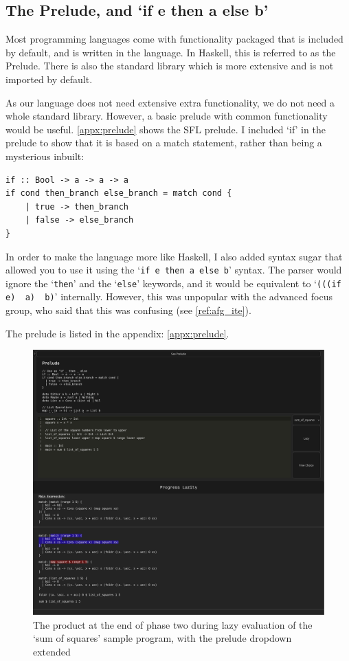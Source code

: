 \subsection{The Prelude, and `if e then a else b'}
Most programming languages come with functionality packaged that is included by default, and is written in the language. In Haskell, this is referred to as the Prelude. There is also the standard library which is more extensive and is not imported by default. 

As our language does not need extensive extra functionality, we do not need a whole standard library. However, a basic prelude with common functionality would be useful. \ref{appx:prelude} shows the SFL prelude. I included `if' in the prelude to show that it is based on a match statement, rather than being a mysterious inbuilt: 

\begin{lstlisting}[language=SFL]
if :: Bool -> a -> a -> a
if cond then_branch else_branch = match cond {
    | true -> then_branch
    | false -> else_branch
}    
\end{lstlisting}

In order to make the language more like Haskell, I also added syntax sugar that allowed you to use it using the `\lstinline[language=SFL_ite]|if e then a else b|' syntax. The parser would ignore the `\lstinline[language=SFL_ite]|then|' and the `\lstinline[language=SFL_ite]|else|' keywords, and it would be equivalent to `\lstinline[language=SFL_ite]|(((if e)  a)  b)|' internally. However, this was unpopular with the advanced focus group, who said that this was confusing (see \ref{ref:afg_ite}). 

The prelude is listed in the appendix: \ref{appx:prelude}.

\begin{figure}[h]
    \centering
    \includegraphics[width=1\linewidth]{images/phase-2-end2.png} 
    \captionsetup{justification=centering}
    \caption{The product at the end of phase two during lazy evaluation of the `sum of squares' sample program, with the prelude dropdown extended}
    \label{fig:screenshot_c2_end}
\end{figure}

